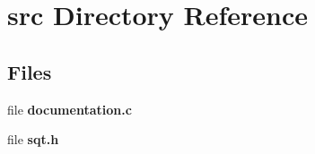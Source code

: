 \section{src Directory Reference}
\label{dir_68267d1309a1af8e8297ef4c3efbcdba}
\subsection*{Files}
\begin{DoxyCompactItemize}
\item 
file {\bfseries documentation.\+c}
\item 
file {\bfseries sqt.\+h}
\end{DoxyCompactItemize}
